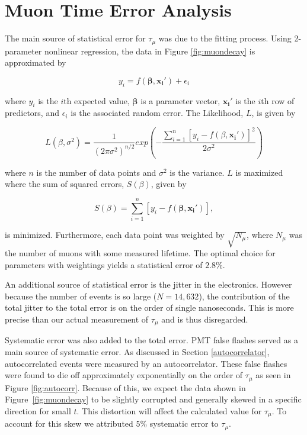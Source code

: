 
\section{Muon Time Error Analysis}\label{muontimeerroranalysis}

The main source of statistical error for $\tau_{\mu}$ was due to the fitting process.  Using 2-parameter nonlinear regression, the data in Figure \ref{fig:muondecay} is approximated by

\begin{equation}
\label{nonlinfit}
y_{i}=f(\mathbf{\beta},\mathbf{x_{i}'})+\epsilon_{i}
\end{equation}

where $y_{i}$ is the $i$th expected value, $\mathbf{\beta}$ is a parameter vector, $\mathbf{x_{i}'}$ is the $i$th row of predictors, and $\epsilon_{i}$ is the associated random error.  The Likelihood, $L$, is given by 

\begin{equation}
\label{likelihood}
L(\beta,\sigma^{2})=\frac{1}{(2\pi\sigma^{2})^{n/2}}exp(-\frac{\sum_{i=1}^{n}[y_{i}-f(\beta,\mathbf{x_{i}'})]^{2}}{2\sigma^{2}})
\end{equation}

where $n$ is the number of data points and $\sigma^{2}$ is the variance. $L$ is maximized where the sum of squared errors, $S(\beta)$, given by

\begin{equation}
\label{sse}
S(\beta) = \sum_{i=1}^{n}[y_{i}-f(\mathbf{\beta},\mathbf{x_{i}'})],
\end{equation}

is minimized.  Furthermore, each data point was weighted by $\sqrt{N_{\mu}}$, where $N_{\mu}$ was the number of muons with some measured lifetime.  The optimal choice for parameters with weightings yields a statistical error of $2.8\%$.  

An additional source of statistical error is the jitter in the electronics.  However because the number of events is so large ($N=14,632$), the contribution of the total jitter to the total error is on the order of single nanoseconds.  This is more precise than our actual measurement of $\tau_{\mu}$ and is thus disregarded. 
 
Systematic error was also added to the total error.  PMT false flashes served as a main source of systematic error.  As discussed in Section \ref{autocorrelator}, autocorrelated events were measured by an autocorrelator. These false flashes were found to die off approximately exponentially on the order of $\tau_{\mu}$ as seen in Figure \ref{fig:autocorr}.  Because of this, we expect the data shown in Figure~\ref{fig:muondecay} to be slightly corrupted and generally skewed in a specific direction for small $t$.  This distortion will affect the calculated value for $\tau_{\mu}$.  To account for this skew we attributed $5\%$ systematic error to $\tau_{\mu}$.

